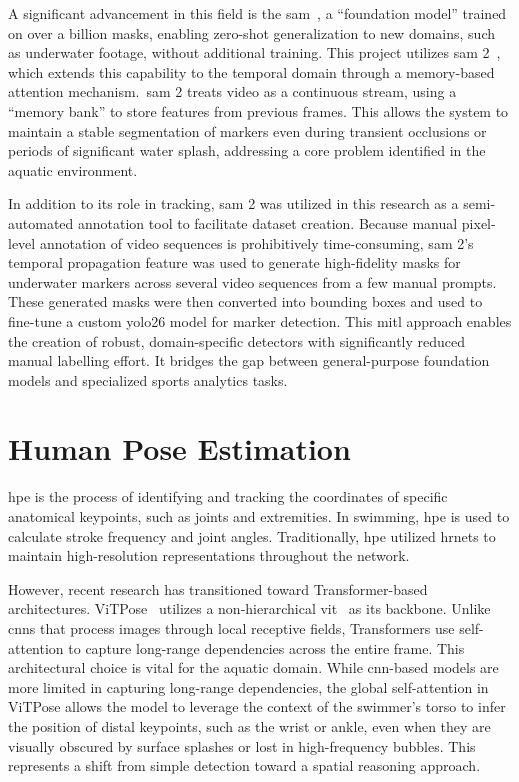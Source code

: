 A significant advancement in this field is the \gls{sam}~\cite{kirillov2023segment}, a ``foundation model'' trained on over a billion masks, enabling zero-shot generalization to new domains, such as underwater footage, without additional training. This project utilizes \gls{sam} 2~\cite{ravi2024sam}, which extends this capability to the temporal domain through a memory-based attention mechanism.\ \gls{sam} 2 treats video as a continuous stream, using a ``memory bank'' to store features from previous frames. This allows the system to maintain a stable segmentation of markers even during transient occlusions or periods of significant water splash, addressing a core problem identified in the aquatic environment.

In addition to its role in tracking, \gls{sam} 2 was utilized in this research as a semi-automated annotation tool to facilitate dataset creation. Because manual pixel-level annotation of video sequences is prohibitively time-consuming, \gls{sam} 2's temporal propagation feature was used to generate high-fidelity masks for underwater markers across several video sequences from a few manual prompts. These generated masks were then converted into bounding boxes and used to fine-tune a custom \gls{yolo26} model for marker detection. This \gls{mitl} approach enables the creation of robust, domain-specific detectors with significantly reduced manual labelling effort. It bridges the gap between general-purpose foundation models and specialized sports analytics tasks.

\section{Human Pose Estimation}
\gls{hpe} is the process of identifying and tracking the coordinates of specific anatomical keypoints, such as joints and extremities. In swimming, \gls{hpe} is used to calculate stroke frequency and joint angles. Traditionally, \gls{hpe} utilized \gls{hrnet}s to maintain high-resolution representations throughout the network.

However, recent research has transitioned toward Transformer-based architectures. ViTPose~\cite{xu2022vitpose} utilizes a non-hierarchical \gls{vit}~\cite{dosovitskiy2020image} as its backbone. Unlike \gls{cnn}s that process images through local receptive fields, Transformers use self-attention to capture long-range dependencies across the entire frame. This architectural choice is vital for the aquatic domain. While \gls{cnn}-based models are more limited in capturing long-range dependencies, the global self-attention in ViTPose allows the model to leverage the context of the swimmer's torso to infer the position of distal keypoints, such as the wrist or ankle, even when they are visually obscured by surface splashes or lost in high-frequency bubbles. This represents a shift from simple detection toward a spatial reasoning approach.

